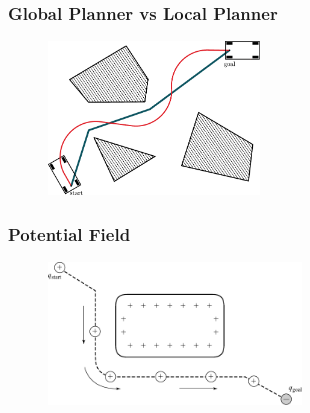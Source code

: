 \begin{frame}
	\frametitle{Global Planner vs Local Planner}
	
	\begin{figure}[!h]
		\includegraphics[width=0.5\textwidth]{images/global_local_plan.pdf}
	\end{figure}
	
\end{frame}

\begin{frame}
	\frametitle{Potential Field}
	
	\begin{figure}
		\includegraphics[width=0.6\textwidth]{images/potential_field_concept.pdf}
	\end{figure}
	
\end{frame}


